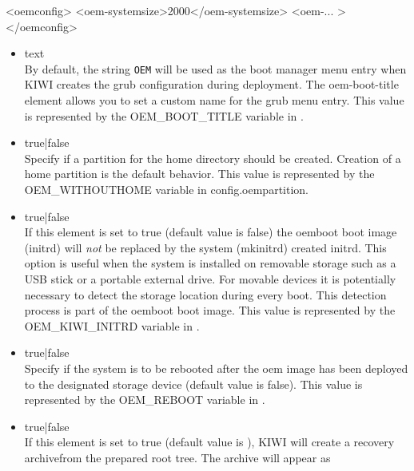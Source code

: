 \begin{itemize}
\begin{xml}
<oemconfig>
  <oem-systemsize>2000</oem-systemsize>
  <oem-... >
</oemconfig>
\end{xml}

	\begin{itemize}
    \item {}text\\
       By default, the string \verb!OEM! will be used as the boot manager 
       menu entry when KIWI creates the grub configuration during
       deployment. The oem-boot-title element allows you to set a custom
       name for the grub menu entry. This value is represented by the
       OEM\_BOOT\_TITLE variable in .
	\item {}true|false\\
       Specify if a partition for the home directory should be created.
       Creation of a home partition is the default behavior. This value is 
       represented by the OEM\_WITHOUTHOME variable in config.oempartition.
	\item {}true|false\\
       If this element is set to true (default value is false) the oemboot 
       boot image (initrd) will \emph{not} be replaced by the system 
       (mkinitrd) created initrd. This option is useful when the system
       is installed on removable storage such as a USB stick or a portable
       external drive. For movable devices it is potentially necessary to 
       detect the storage location during every boot. This detection
       process is part of the oemboot boot image. This value is represented
       by the OEM\_KIWI\_INITRD variable in .
	\item {}true|false\\
       Specify if the system is to be rebooted after the oem image has been
       deployed to the designated storage device (default value is false). 
       This value is represented by the OEM\_REBOOT variable in 
       .
	\item {}true|false\\
      If this element is set to true (default value is ), KIWI will
      create a recovery archivefrom the prepared root tree. The archive will 
      appear as 

\end{itemize}
\end{itemize}
